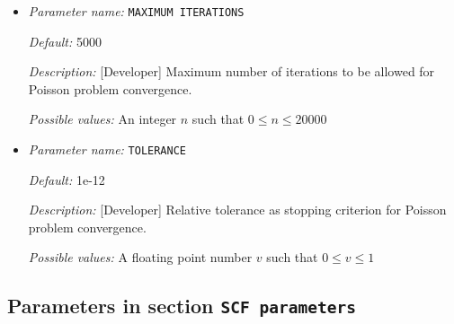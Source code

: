 \begin{itemize}
\item {\it Parameter name:} {\tt MAXIMUM ITERATIONS}
\label{parameters:Poisson problem parameters/MAXIMUM ITERATIONS}
\label{parameters:Poisson_20problem_20parameters/MAXIMUM_20ITERATIONS}




{\it Default:} 5000


{\it Description:} [Developer] Maximum number of iterations to be allowed for Poisson problem convergence.


{\it Possible values:} An integer $n$ such that $0\leq n \leq 20000$
\item {\it Parameter name:} {\tt TOLERANCE}
\label{parameters:Poisson problem parameters/TOLERANCE}
\label{parameters:Poisson_20problem_20parameters/TOLERANCE}




{\it Default:} 1e-12


{\it Description:} [Developer] Relative tolerance as stopping criterion for Poisson problem convergence.


{\it Possible values:} A floating point number $v$ such that $0 \leq v \leq 1$
\end{itemize}

\subsection{Parameters in section \tt SCF parameters}
\label{parameters:SCF_20parameters}

